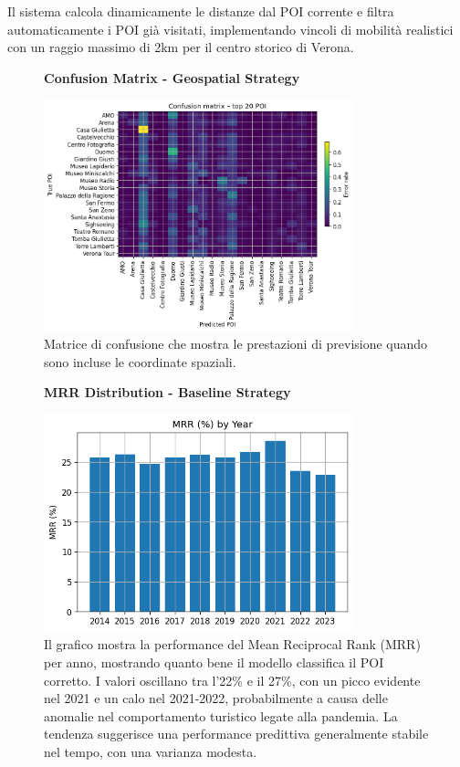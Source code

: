 \begin{itemize}
\begin{enumerate}
Il sistema calcola dinamicamente le distanze dal POI corrente e filtra automaticamente i POI già visitati, implementando vincoli di mobilità realistici con un raggio massimo di 2km per il centro storico di Verona.

\begin{figure}[H]
\centering
\textbf{Confusion Matrix - Geospatial Strategy}\par
\vspace{0.5em}
\includegraphics[width=0.8\textwidth]{../../img/SPACE-GEO_n-1_come_current_POI/confusion_matrix.png}
\caption{Matrice di confusione che mostra le prestazioni di previsione quando sono incluse le coordinate spaziali.}
\label{fig:geospatial_confusion}
\end{figure}

\begin{figure}[H]
\centering
\textbf{MRR Distribution - Baseline Strategy}\par
\vspace{0.5em}
\includegraphics[width=0.8\textwidth]{../../img/SPACE-GEO_n-1_come_current_POI/MRR.png}
\caption{Il grafico mostra la performance del Mean Reciprocal Rank (MRR) per anno, mostrando quanto bene il modello classifica il POI corretto. I valori oscillano tra l'22\% e il 27\%, con un picco evidente nel 2021 e un calo nel 2021-2022, probabilmente a causa delle anomalie nel comportamento turistico legate alla pandemia. La tendenza suggerisce una performance predittiva generalmente stabile nel tempo, con una varianza modesta.}
\label{fig:baseline_mrr}
\end{figure}


\end{enumerate}
\end{itemize}
